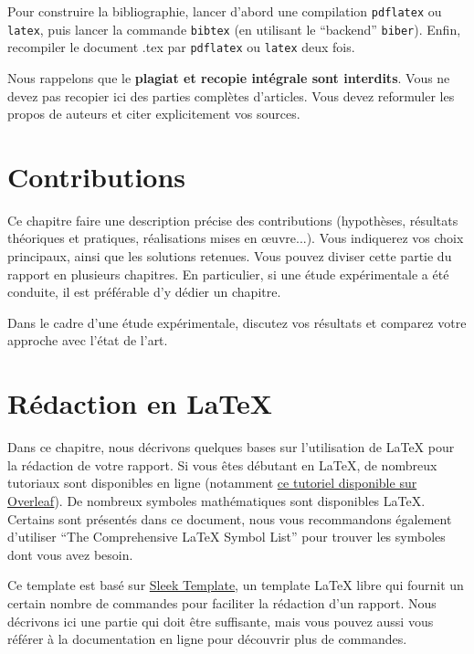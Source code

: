 \documentclass[a4paper, 12pt]{report}
\begin{document}
   Pour construire la bibliographie, lancer d'abord une compilation \verb+pdflatex+ ou \verb+latex+, puis lancer la commande \verb+bibtex+ (en utilisant le ``backend'' \verb+biber+). Enfin,  recompiler le document .tex par \verb+pdflatex+ ou \verb+latex+ deux fois.
   
   Nous rappelons que le  \textbf{plagiat et recopie intégrale sont interdits}. Vous ne devez pas recopier ici des parties complètes d'articles. Vous devez reformuler les propos de auteurs et citer explicitement vos sources. 
    
    
    \chapter{Contributions}
    Ce chapitre faire une description précise des contributions (hypothèses, résultats théoriques et pratiques, réalisations mises en \oe uvre...).  Vous indiquerez vos choix principaux, ainsi que les solutions retenues. 
	Vous pouvez diviser cette partie du rapport en plusieurs chapitres. En particulier, si une étude expérimentale a été conduite, il est préférable d'y dédier un chapitre. 
    
    Dans le cadre d'une étude expérimentale, discutez vos résultats et comparez  votre approche avec l'état de l'art. 

    \chapter{Rédaction en \LaTeX}
    Dans ce chapitre, nous décrivons quelques bases sur l'utilisation de \LaTeX{} pour la rédaction de votre rapport.
    Si vous êtes débutant en \LaTeX{}, de nombreux tutoriaux sont disponibles en ligne (notamment \href{https://www.overleaf.com/learn}{ce tutoriel disponible sur Overleaf}). De nombreux symboles mathématiques sont disponibles \LaTeX{}. Certains sont présentés dans ce document, nous vous recommandons également d'utiliser \enquote{The Comprehensive \LaTeX{} Symbol List} \cite{pakin2020comprehensive} pour trouver les symboles dont vous avez besoin.
    
    Ce template est basé sur \href{https://fr.overleaf.com/latex/templates/sleek-template/hrksrrdywhfk}{Sleek Template}, un template \LaTeX{} libre qui fournit un certain nombre de commandes pour faciliter la rédaction d'un rapport. Nous décrivons ici une partie qui doit être suffisante, mais vous pouvez aussi vous référer à la documentation en ligne pour découvrir plus de commandes.
    
\end{document}
